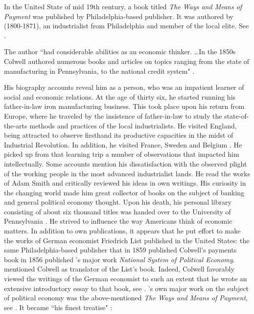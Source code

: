 In the United State of mid 19th century, a book titled \textit{The Ways and Means of Payment} was published by Philadelphia-based publisher. It was authored by \citeauthor{colwell1859} (1800-1871), an industrialist from Philadelphia and member of the local elite. See \citep{colwell1859}. 

The author ``had considerable abilities as an economic thinker. \dots  In the 1850s Colwell authored numerous books and articles on topics ranging from the state of manufacturing in Pennsylvania, to the national credit system" \citep[chapter~8, pp.~109-121]{davenport}. 

His biography accounts reveal him as a person, who was an impatient learner of social and economic relations. At the age of thirty six, he started running his father-in-law iron manufacturing business. This took place upon his return from Europe, where he traveled by the insistence of father-in-law to study the state-of-the-arts methods and practices of the local industrialists. He visited England, being attracted to observe firsthand its productive capacities in the midst of Industrial Revolution. In addition, he visited France, Sweden and Belgium \citep[footnote 3, p.~235]{davenport}. He picked up from that learning trip a number of observations that impacted him intellectually. Some accounts mention his dissatisfaction with the observed plight of the working people in the most advanced industrialist lands. He read the works of Adam Smith and critically reviewed his ideas in own writings. His curiosity in the changing world made him great collector of books on the subject of banking and general political economy thought. Upon his death, his personal library consisting of about six thousand titles was handed over to the University of Pennsylvania \citeyearpar[p.~110]{davenport}. He strived to influence the way Americans think of economic matters. In addition to own publications, it appears that he put effort to make the works of German economist Friedrich List published in the United States: the same Philadelphia-based publisher that in 1859 published Colwell's payments book in 1856 published \citeauthor{flist1856}'s major work \textit{National System of Political Economy}. \cite[footnote 12, p.~380]{breton1964} mentioned Colwell as translator of the List's book. Indeed, Colwell favorably viewed the writings of the German economist to such an extent that he wrote an extensive introductory essay to that book, see \citep{colwell1856}. \citeauthor{colwell1859}'s own major work on the subject of political economy was the above-mentioned \textit{The Ways and Means of Payment}, see \citeyearpar{colwell1859}. It became ``his finest treatise" \citep[p.~819]{dorfman2}:    

